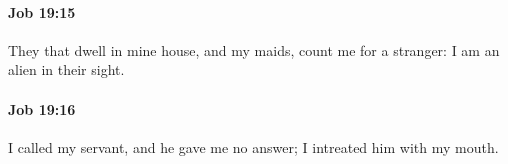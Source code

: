 		\paragraph{Job 19:15} %
			\label{JOB-19-15}

			They that dwell in mine house, and my maids, count me for a stranger: I am an alien in their sight.


		\paragraph{Job 19:16} %
			\label{JOB-19-16}

			I called my servant, and he gave me no answer; I intreated him with my mouth.


